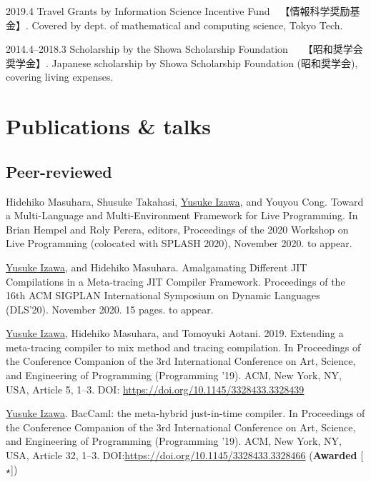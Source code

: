 \documentclass[11pt]{article} %
\newcommand{\YusukeIzawa}{\underline{Yusuke Izawa}}
\newcommand{\伊澤侑祐}{\underline{伊澤侑祐}}
\newcommand{\jit}{\textsc{JIT} }
\begin{document}
\grant
{2019.4}
{Travel Grants by Information Science Incentive Fund~~【情報科学奨励基金】.}
{Covered by dept. of mathematical and computing science, Tokyo Tech.}


\grant
{2014.4--2018.3}
{Scholarship by the Showa Scholarship Foundation~~~【昭和奨学会奨学金】.}
{Japanese scholarship by Showa Scholarship Foundation (昭和奨学会), covering
  living expenses.}


\section*{Publications \& talks}

\subsection*{Peer-reviewed}

 Hidehiko Masuhara, Shusuke Takahasi, \YusukeIzawa, and Youyou
Cong. Toward a Multi-Language and Multi-Environment Framework for Live Programming.
In Brian Hempel and Roly Perera, editors, Proceedings of the 2020 Workshop on Live
Programming (colocated with SPLASH 2020), November 2020. to appear.
\medskip

 \YusukeIzawa, and Hidehiko Masuhara. Amalgamating Different \jit
Compilations in a Meta-tracing \jit Compiler Framework. Proceedings of the 16th ACM
SIGPLAN International Symposium on Dynamic Languages (DLS'20). November 2020. 15
pages. to appear.
\medskip

 \YusukeIzawa, Hidehiko Masuhara, and Tomoyuki
Aotani. 2019. Extending a meta-tracing compiler to mix method and tracing
compilation. In Proceedings of the Conference Companion of the 3rd International
Conference on Art, Science, and Engineering of Programming (Programming
’19). ACM, New York, NY, USA, Article 5, 1–3. DOI:
\url{https://doi.org/10.1145/3328433.3328439}
\medskip

 \YusukeIzawa. BacCaml: the meta-hybrid just-in-time compiler. In
Proceedings of the Conference Companion of the 3rd International Conference on
Art, Science, and Engineering of Programming (Programming ’19). ACM, New York,
NY, USA, Article 32, 1–3. DOI:\url{https://doi.org/10.1145/3328433.3328466}
(\textbf{Awarded} [$\star$])
\medskip
\end{document}
